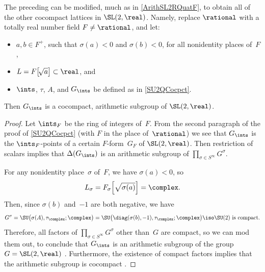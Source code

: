 \begin{eg} \label{SU2TotReal}
The preceding %
 can be modified, much as in \cref{ArithSL2RQuatF}, to obtain all of the other cocompact lattices in $\SL(2,\real)$. Namely, replace $\rational$ with a totally real number field $F \neq \rational$, and let:
	\begin{itemize}
	\item $a,b \in F^+$, such that $\sigma(a) < 0$ and $\sigma(b) < 0$, for all nonidentity places of~$F$,
	\item $L = F \bigl[\! \sqrt{a} \bigr] \subset \real$,
	and
	\item $\ints$,  $\tau$, $A$, and $G_\ints$ be defined as in \cref{SU2QCocpct}. 
	\end{itemize}
Then $G_\ints$ is a cocompact, arithmetic subgroup of $\SL(2,\real)$.
\end{eg}

\begin{proof}
Let $\ints_F$ be the ring of integers of~$F$. From the second paragraph %
of the proof of \cref{SU2QCocpct} (with $F$ in the place of~$\rational$) we see that $G_\ints$ is the $\ints_F$-points of a certain $F$-form~$G_F$ of $\SL(2,\real)$. Then restriction of scalars  implies that $\Delta(G_\ints)$ is an arithmetic subgroup of $\prod_{\sigma \in S^\infty} G^\sigma$. 

For any nonidentity place~$\sigma$ of~$F$, we have $\sigma(a) < 0$, so
	$$ L_\sigma = F_\sigma \Bigl[ \sqrt{\sigma \vbox to 7pt{\vss\hbox{$($}} a \vbox to 7pt{\vss\hbox{$)$}}} \Bigr] = \complex .$$
Then, since $\sigma(b)$ and~$-1$ are both negative, we have
	$$ \text{$G^\sigma = \SU \bigl( \sigma(A) , \tau_\complex ; \complex \bigr) = \SU \bigl( \diag( \sigma(b), -1 ), \tau_\complex ; \complex \bigr) \iso \SU(2)$ is compact} .$$
Therefore, all factors of $\prod_{\sigma \in S^\infty} G^\sigma$ other than~$G$ are compact, so we can mod them out, to conclude that $G_\ints$ is an arithmetic subgroup of the group $G = \SL(2,\real)$ . Furthermore, the existence of compact factors implies that the arithmetic subgroup  is cocompact .
\end{proof}


